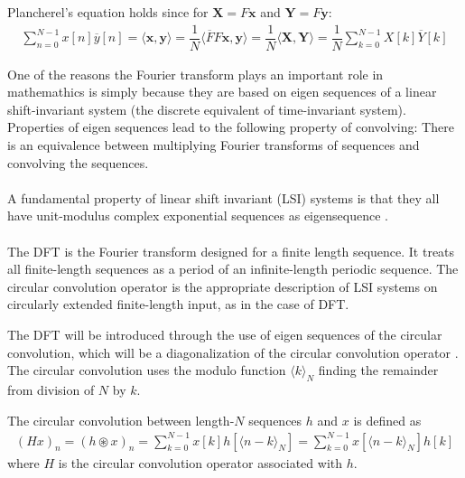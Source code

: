Plancherel's equation holds since for $\textbf{X} = F\textbf{x}$ and $\textbf{Y} = F\textbf{y}$:
\begin{align*}
\sum_{n=0}^{N-1} x[n] \overline{y}[n] = \langle \textbf{x},\textbf{y} \rangle = \dfrac{1}{N} \langle \overline{F}F\textbf{x},\textbf{y} \rangle = \dfrac{1}{N} \langle \textbf{X},\textbf{Y} \rangle = \dfrac{1}{N} \sum_{k=0}^{N-1} X[k] \overline{Y}[k]
\end{align*}

One of the reasons the Fourier transform plays an important role in mathemathics is simply because they are based on eigen sequences of a linear shift-invariant system (the discrete equivalent of time-invariant system).
Properties of eigen sequences lead to the following property of convolving:
There is an equivalence between multiplying Fourier transforms of sequences and convolving the sequences.
\\\\
 A fundamental property of linear shift invariant (LSI) systems is that they all have unit-modulus complex exponential sequences as eigensequence \cite{FSP}.
\\\\
The DFT is the Fourier transform designed for a finite length sequence.
It treats all finite-length sequences as a period of an infinite-length periodic sequence.
The circular convolution operator is the appropriate description of LSI systems on circularly extended finite-length input, as in the case of DFT. 

The DFT will be introduced through the use of eigen sequences of the circular convolution, which will be a diagonalization of the circular convolution operator \cite{FSP}. The circular convolution uses the modulo function $\langle k\rangle_N$ finding the remainder from division of $N$ by $k$.

\begin{definition}
 	The circular convolution between length-$N$ sequences $h$ and $x$ is defined as
\begin{align*}
	(Hx)_n = (h \circledast x)_n = \sum_{k = 0}^{N-1} x[k] h[\langle n-k\rangle_N] =\sum_{k = 0}^{N-1} x[\langle n-k\rangle_N] h[k]
\end{align*}
where $H$ is the circular convolution operator associated with $h$.
\end{definition}

